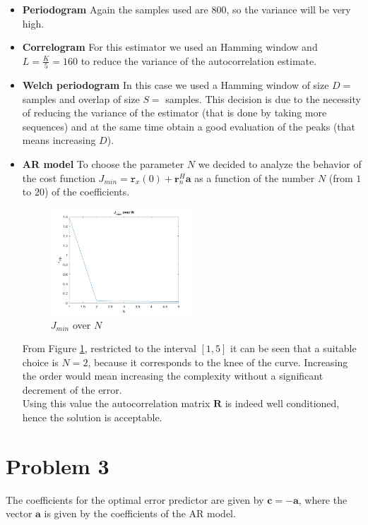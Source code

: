 \documentclass[a4paper, 12pt]{report}
\begin{document}
\begin{itemize}
	
	\item {\bf Periodogram} Again the samples used are 800, so the variance will be very high.
	
	\item {\bf Correlogram}  For this estimator we used an Hamming window and $L=\frac{K}{5}=160$ to reduce the variance of the autocorrelation estimate.
	
	\item {\bf Welch periodogram} In this case we used a Hamming window of size $D=$ samples and overlap of size $S=$ samples. This decision is due to the necessity of reducing the variance of the estimator (that is done by taking more sequences) and at the same time obtain a good evaluation of the peaks (that means increasing $D$).
	
	
\item {\bf AR model} To choose the parameter $N$ we decided to analyze the behavior of the cost function $J_{min} = \mathtt{r}_x(0) + \mathbf{r}_n^H \mathbf{a}$ as a function of the number $N$ (from $1$ to $20$) of the coefficients.

\begin{figure}[H]
	\centering
	\includegraphics[width=0.5\textwidth]{choiceofn}
	\caption{$J_{min}$ over $N$}
	\label{fig:choiceofn}
\end{figure}

From Figure \ref{fig:choiceofn}, restricted to the interval $[1,5]$ it can be seen that a suitable choice is $N=2$, because it corresponds to the knee of the curve. Increasing the order would mean increasing the complexity without a significant decrement of the error.  \\
Using this value the autocorrelation matrix $\mathbf{R}$ is indeed well conditioned, hence the solution is acceptable.
\end{itemize}

\section*{Problem 3}
The coefficients for the optimal error predictor are given by $ \mathbf{c} = -\mathbf{a}$, where the vector $\mathbf{a}$ is given by the coefficients of the AR model.
\end{document}
